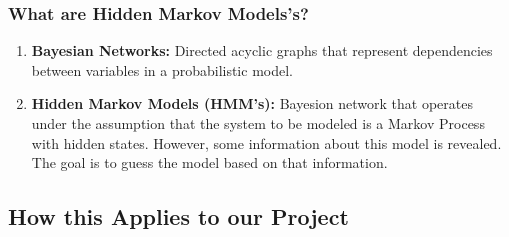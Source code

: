 \documentclass{beamer}
\begin{document}
\begin{frame}
   \frametitle{What are Hidden Markov Models's?}
   \begin{enumerate}
   \pause
   \item[] \small{\textbf{Bayesian Networks:} Directed acyclic graphs that
   represent dependencies between variables in a probabilistic model.}
   \pause
   \item[] \small{\textbf{Hidden Markov Models (HMM's):} Bayesion network that
   operates under the assumption that the system to be modeled is a Markov
   Process with hidden states. However, some information about this model is
   revealed. The goal is to guess the model based on that information.}
   \end{enumerate}
\end{frame}

\subsection{How this Applies to our Project}
\end{document}
